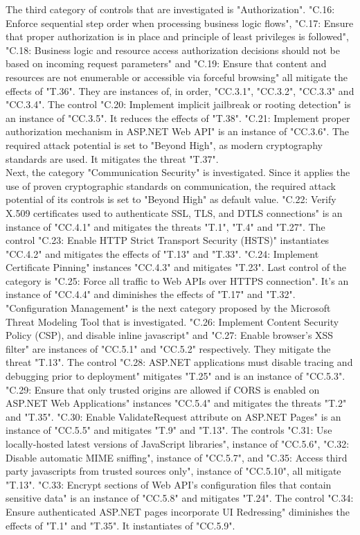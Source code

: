 \newline
The third category of controls that are investigated is "Authorization". "C.16: Enforce sequential step order when processing business logic flows", "C.17: Ensure that proper authorization is in place and principle of least privileges is followed", "C.18: Business logic and resource access authorization decisions should not be based on incoming request parameters" and "C.19: Ensure that content and resources are not enumerable or accessible via forceful browsing" all mitigate the effects of "T.36". They are instances of, in order, "CC.3.1", "CC.3.2", "CC.3.3" and "CC.3.4". The control "C.20: Implement implicit jailbreak or rooting detection" is an instance of "CC.3.5". It reduces the effects of "T.38". "C.21: Implement proper authorization mechanism in ASP.NET Web API" is an instance of "CC.3.6". The required attack potential is set to "Beyond High", as modern cryptography standards are used. It mitigates the threat "T.37". \\
\newline
Next, the category "Communication Security" is investigated. Since it applies the use of proven cryptographic standards on communication, the required attack potential of its controls is set to "Beyond High" as default value. "C.22: Verify X.509 certificates used to authenticate SSL, TLS, and DTLS connections" is an instance of "CC.4.1" and mitigates the threats "T.1", "T.4" and "T.27". The control "C.23: Enable HTTP Strict Transport Security (HSTS)" instantiates "CC.4.2" and mitigates the effects of "T.13" and "T.33". "C.24: Implement Certificate Pinning" instances "CC.4.3" and mitigates "T.23". Last control of the category is "C.25: Force all traffic to Web APIs over HTTPS connection". It's an instance of "CC.4.4" and diminishes the effects of "T.17" and "T.32".\\ 
\newline
"Configuration Management" is the next category proposed by the Microsoft Threat Modeling Tool that is investigated. "C.26: Implement Content Security Policy (CSP), and disable inline javascript" and "C.27: Enable browser's XSS filter" are instances of "CC.5.1" and "CC.5.2" respectively. They mitigate the threat "T.13". The control "C.28: ASP.NET applications must disable tracing and debugging prior to deployment" mitigates "T.25" and is an instance of "CC.5.3". "C.29: Ensure that only trusted origins are allowed if CORS is enabled on ASP.NET Web Applications" instances "CC.5.4" and mitigates the threats "T.2" and "T.35". "C.30: Enable ValidateRequest attribute on ASP.NET Pages" is an instance of "CC.5.5" and mitigates "T.9" and "T.13". The controls "C.31: Use locally-hosted latest versions of JavaScript libraries", instance of "CC.5.6", "C.32: Disable automatic MIME sniffing", instance of "CC.5.7", and "C.35: Access third party javascripts from trusted sources only", instance of "CC.5.10", all mitigate "T.13". "C.33: Encrypt sections of Web API's configuration files that contain sensitive data" is an instance of "CC.5.8" and mitigates "T.24". The control "C.34: Ensure authenticated ASP.NET pages incorporate UI Redressing" diminishes the effects of "T.1" and "T.35". It instantiates of "CC.5.9".\\
